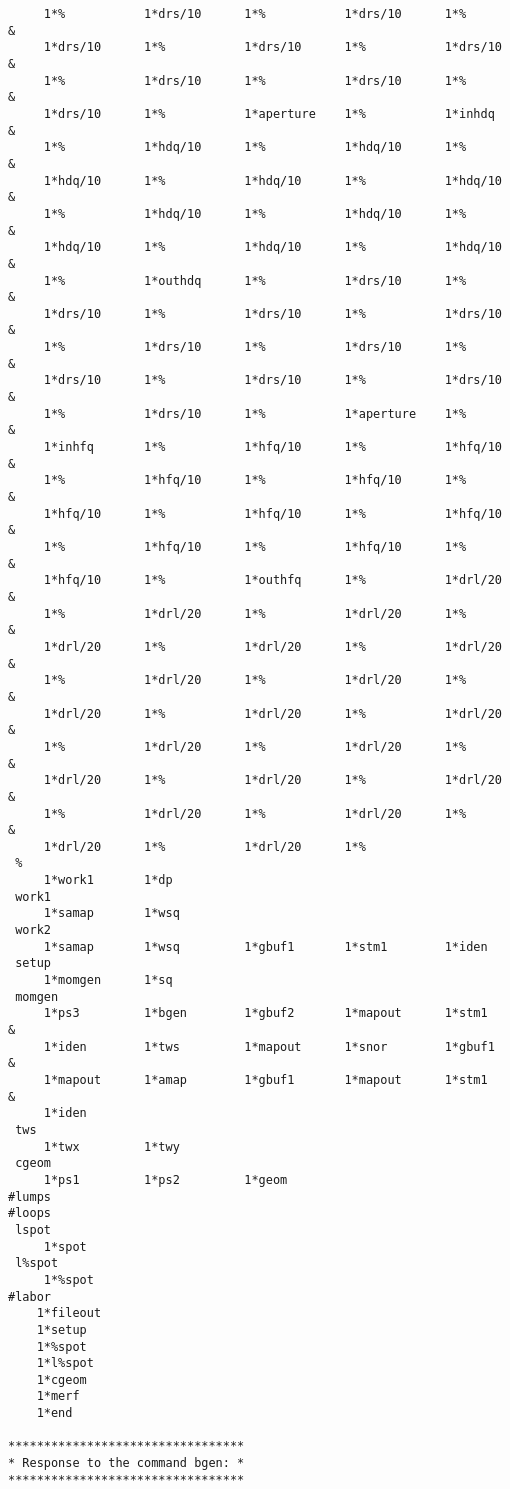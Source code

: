 \begin{footnotesize}
\begin{verbatim}
     1*%           1*drs/10      1*%           1*drs/10      1*%        &
     1*drs/10      1*%           1*drs/10      1*%           1*drs/10   &
     1*%           1*drs/10      1*%           1*drs/10      1*%        &
     1*drs/10      1*%           1*aperture    1*%           1*inhdq    &
     1*%           1*hdq/10      1*%           1*hdq/10      1*%        &
     1*hdq/10      1*%           1*hdq/10      1*%           1*hdq/10   &
     1*%           1*hdq/10      1*%           1*hdq/10      1*%        &
     1*hdq/10      1*%           1*hdq/10      1*%           1*hdq/10   &
     1*%           1*outhdq      1*%           1*drs/10      1*%        &
     1*drs/10      1*%           1*drs/10      1*%           1*drs/10   &
     1*%           1*drs/10      1*%           1*drs/10      1*%        &
     1*drs/10      1*%           1*drs/10      1*%           1*drs/10   &
     1*%           1*drs/10      1*%           1*aperture    1*%        &
     1*inhfq       1*%           1*hfq/10      1*%           1*hfq/10   &
     1*%           1*hfq/10      1*%           1*hfq/10      1*%        &
     1*hfq/10      1*%           1*hfq/10      1*%           1*hfq/10   &
     1*%           1*hfq/10      1*%           1*hfq/10      1*%        &
     1*hfq/10      1*%           1*outhfq      1*%           1*drl/20   &
     1*%           1*drl/20      1*%           1*drl/20      1*%        &
     1*drl/20      1*%           1*drl/20      1*%           1*drl/20   &
     1*%           1*drl/20      1*%           1*drl/20      1*%        &
     1*drl/20      1*%           1*drl/20      1*%           1*drl/20   &
     1*%           1*drl/20      1*%           1*drl/20      1*%        &
     1*drl/20      1*%           1*drl/20      1*%           1*drl/20   &
     1*%           1*drl/20      1*%           1*drl/20      1*%        &
     1*drl/20      1*%           1*drl/20      1*%
 %
     1*work1       1*dp
 work1
     1*samap       1*wsq
 work2
     1*samap       1*wsq         1*gbuf1       1*stm1        1*iden
 setup
     1*momgen      1*sq
 momgen
     1*ps3         1*bgen        1*gbuf2       1*mapout      1*stm1     &
     1*iden        1*tws         1*mapout      1*snor        1*gbuf1    &
     1*mapout      1*amap        1*gbuf1       1*mapout      1*stm1     &
     1*iden
 tws
     1*twx         1*twy
 cgeom
     1*ps1         1*ps2         1*geom
#lumps
#loops
 lspot
     1*spot
 l%spot
     1*%spot
#labor
    1*fileout
    1*setup
    1*%spot
    1*l%spot
    1*cgeom
    1*merf
    1*end

*********************************
* Response to the command bgen: *
*********************************


\end{verbatim}
\end{footnotesize}

